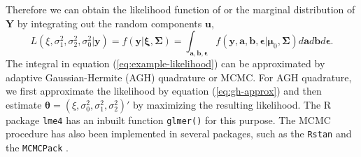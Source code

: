 Therefore we can obtain the likelihood function of or the marginal distribution of $\bm Y$ by
integrating out the random components $\bm u$,
\begin{equation}\label{eq:example-likelihood}
	L(\xi, \sigma_1^2, \sigma_2^2, \sigma_0^2|\bm y)=f(\bm y|\bm \xi, \bm \Sigma)=
	\int_{\bm{a,b,\epsilon}} f(\bm y, \bm a, \bm b, \bm \epsilon |\bm \mu_0, \bm \Sigma)d\bm a d 
	\bm b
	d\bm \epsilon .
\end{equation}
The integral in equation (\ref{eq:example-likelihood}) can be approximated by adaptive
Gaussian-Hermite (AGH) quadrature or MCMC. For AGH quadrature, we first approximate the likelihood
by equation (\ref{eq:gh-approx}) and then estimate $\bm\theta = (\xi, \sigma_0^2, \sigma_1^2,
\sigma_2^2)'$ by maximizing the resulting likelihood. The R package \verb"lme4" 
\citep{bates2012lme4} 
has
an inbuilt function \verb"glmer()" for this purpose. The MCMC procedure has also been implemented 
in several
packages, such as the \verb|Rstan| \citep{Rstan} and the \verb|MCMCPack| 
\citep{martin2011mcmcpack}. 

	
	
	
\newpage	
	
	
